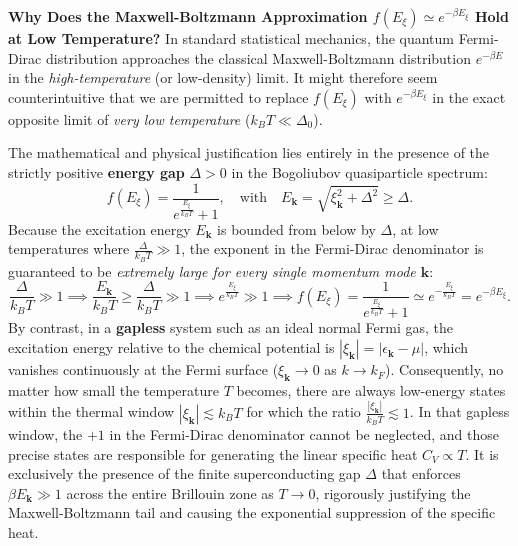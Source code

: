\begin{remark}
    \textbf{Why Does the Maxwell-Boltzmann Approximation \( f(E_\xi) \simeq e^{-\beta E_\xi} \) Hold at Low Temperature?} In standard statistical mechanics, the quantum Fermi-Dirac distribution approaches the classical Maxwell-Boltzmann distribution \( e^{-\beta E} \) in the \emph{high-temperature} (or low-density) limit. It might therefore seem counterintuitive that we are permitted to replace \( f(E_\xi) \) with \( e^{-\beta E_\xi} \) in the exact opposite limit of \emph{very low temperature} (\( k_B T \ll \Delta_0 \)).

    The mathematical and physical justification lies entirely in the presence of the strictly positive \textbf{energy gap} \( \Delta > 0 \) in the Bogoliubov quasiparticle spectrum:
    \[
        f(E_\xi) = \frac{1}{e^{\frac{E_\xi}{k_B T}} + 1}, \quad \text{with} \quad E_{\mathbf{k}} = \sqrt{\xi_{\mathbf{k}}^2 + \Delta^2} \ge \Delta.
    \]
    Because the excitation energy \( E_{\mathbf{k}} \) is bounded from below by \( \Delta \), at low temperatures where \( \frac{\Delta}{k_B T} \gg 1 \), the exponent in the Fermi-Dirac denominator is guaranteed to be \emph{extremely large for every single momentum mode \( \mathbf{k} \)}:
    \[
        \frac{\Delta}{k_B T} \gg 1 \implies \frac{E_{\mathbf{k}}}{k_B T} \ge \frac{\Delta}{k_B T} \gg 1 \implies e^{\frac{E_\xi}{k_B T}} \gg 1 \implies f(E_\xi) = \frac{1}{e^{\frac{E_\xi}{k_B T}} + 1} \simeq e^{-\frac{E_\xi}{k_B T}} = e^{-\beta E_\xi}.
    \]
    By contrast, in a \textbf{gapless} system such as an ideal normal Fermi gas, the excitation energy relative to the chemical potential is \( |\xi_{\mathbf{k}}| = |\epsilon_{\mathbf{k}} - \mu| \), which vanishes continuously at the Fermi surface (\( \xi_{\mathbf{k}} \to 0 \) as \( k \to k_F \)). Consequently, no matter how small the temperature \( T \) becomes, there are always low-energy states within the thermal window \( |\xi_{\mathbf{k}}| \lesssim k_B T \) for which the ratio \( \frac{|\xi_{\mathbf{k}}|}{k_B T} \lesssim 1 \). In that gapless window, the \( +1 \) in the Fermi-Dirac denominator cannot be neglected, and those precise states are responsible for generating the linear specific heat \( C_V \propto T \). It is exclusively the presence of the finite superconducting gap \( \Delta \) that enforces \( \beta E_{\mathbf{k}} \gg 1 \) across the entire Brillouin zone as \( T \to 0 \), rigorously justifying the Maxwell-Boltzmann tail and causing the exponential suppression of the specific heat.
\end{remark}










